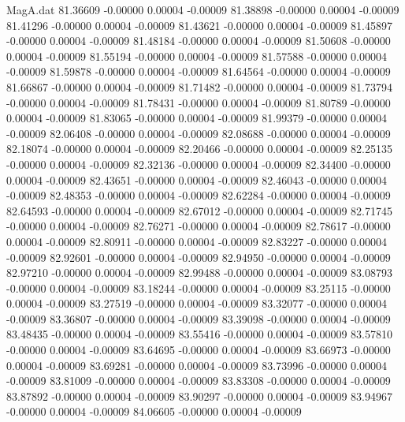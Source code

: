 \begin{filecontents}{MagA.dat}
  81.36609   -0.00000    0.00004   -0.00009
  81.38898   -0.00000    0.00004   -0.00009
  81.41296   -0.00000    0.00004   -0.00009
  81.43621   -0.00000    0.00004   -0.00009
  81.45897   -0.00000    0.00004   -0.00009
  81.48184   -0.00000    0.00004   -0.00009
  81.50608   -0.00000    0.00004   -0.00009
  81.55194   -0.00000    0.00004   -0.00009
  81.57588   -0.00000    0.00004   -0.00009
  81.59878   -0.00000    0.00004   -0.00009
  81.64564   -0.00000    0.00004   -0.00009
  81.66867   -0.00000    0.00004   -0.00009
  81.71482   -0.00000    0.00004   -0.00009
  81.73794   -0.00000    0.00004   -0.00009
  81.78431   -0.00000    0.00004   -0.00009
  81.80789   -0.00000    0.00004   -0.00009
  81.83065   -0.00000    0.00004   -0.00009
  81.99379   -0.00000    0.00004   -0.00009
  82.06408   -0.00000    0.00004   -0.00009
  82.08688   -0.00000    0.00004   -0.00009
  82.18074   -0.00000    0.00004   -0.00009
  82.20466   -0.00000    0.00004   -0.00009
  82.25135   -0.00000    0.00004   -0.00009
  82.32136   -0.00000    0.00004   -0.00009
  82.34400   -0.00000    0.00004   -0.00009
  82.43651   -0.00000    0.00004   -0.00009
  82.46043   -0.00000    0.00004   -0.00009
  82.48353   -0.00000    0.00004   -0.00009
  82.62284   -0.00000    0.00004   -0.00009
  82.64593   -0.00000    0.00004   -0.00009
  82.67012   -0.00000    0.00004   -0.00009
  82.71745   -0.00000    0.00004   -0.00009
  82.76271   -0.00000    0.00004   -0.00009
  82.78617   -0.00000    0.00004   -0.00009
  82.80911   -0.00000    0.00004   -0.00009
  82.83227   -0.00000    0.00004   -0.00009
  82.92601   -0.00000    0.00004   -0.00009
  82.94950   -0.00000    0.00004   -0.00009
  82.97210   -0.00000    0.00004   -0.00009
  82.99488   -0.00000    0.00004   -0.00009
  83.08793   -0.00000    0.00004   -0.00009
  83.18244   -0.00000    0.00004   -0.00009
  83.25115   -0.00000    0.00004   -0.00009
  83.27519   -0.00000    0.00004   -0.00009
  83.32077   -0.00000    0.00004   -0.00009
  83.36807   -0.00000    0.00004   -0.00009
  83.39098   -0.00000    0.00004   -0.00009
  83.48435   -0.00000    0.00004   -0.00009
  83.55416   -0.00000    0.00004   -0.00009
  83.57810   -0.00000    0.00004   -0.00009
  83.64695   -0.00000    0.00004   -0.00009
  83.66973   -0.00000    0.00004   -0.00009
  83.69281   -0.00000    0.00004   -0.00009
  83.73996   -0.00000    0.00004   -0.00009
  83.81009   -0.00000    0.00004   -0.00009
  83.83308   -0.00000    0.00004   -0.00009
  83.87892   -0.00000    0.00004   -0.00009
  83.90297   -0.00000    0.00004   -0.00009
  83.94967   -0.00000    0.00004   -0.00009
  84.06605   -0.00000    0.00004   -0.00009

\end{filecontents}
